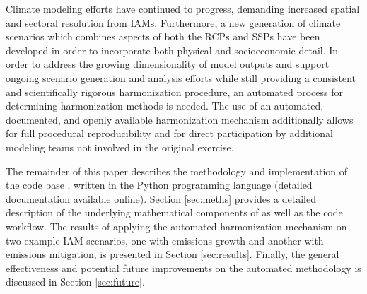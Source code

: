 Climate modeling efforts have continued to progress, demanding increased spatial
and sectoral resolution from IAMs. Furthermore, a new generation of climate
scenarios which combines aspects of both the RCPs and SSPs have been developed
in order to incorporate both physical and socioeconomic detail. In order to
address the growing dimensionality of model outputs and support ongoing scenario
generation and analysis efforts while still providing a consistent and
scientifically rigorous harmonization procedure, an automated process for
determining harmonization methods is needed. The use of an automated,
documented, and openly available harmonization mechanism additionally allows for
full procedural reproducibility and for direct participation by additional
modeling teams not involved in the original exercise.

The remainder of this paper describes the methodology and implementation of the
 code base \cite{matthew_gidden_2017_802832}, written in the Python
% 
% 
programming language (detailed documentation available
\href{http://mattgidden.com/aneris/}{online}). Section \ref{sec:meths} provides
a detailed description of the underlying mathematical components of
 as well as the code workflow. The results of applying the
automated harmonization mechanism on two example IAM scenarios, one with
emissions growth and another with emissions mitigation, is presented in Section
\ref{sec:results}. Finally, the general effectiveness and potential future
improvements on the automated methodology is discussed in Section
\ref{sec:future}.

